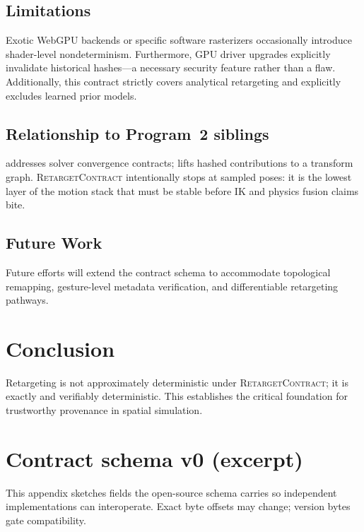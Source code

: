 \documentclass[sigconf,nonacm]{acmart}
\newcommand{\retargetcontract}{\textsc{RetargetContract}}
\begin{document}
\subsection{Limitations}
Exotic WebGPU backends or specific software rasterizers occasionally introduce shader-level nondeterminism. Furthermore, GPU driver upgrades explicitly invalidate historical hashes---a necessary security feature rather than a flaw. Additionally, this contract strictly covers analytical retargeting and explicitly excludes learned prior models. %

\subsection{Relationship to Program~2 siblings}
\cite{paper-7-ik-siggraph2027} addresses solver convergence contracts;
\cite{paper-8-unified-siggraph2027} lifts hashed contributions to a transform
graph. \retargetcontract{} intentionally stops at sampled poses: it is the
lowest layer of the motion stack that must be stable before IK and physics
fusion claims bite.

\subsection{Future Work}
Future efforts will extend the contract schema to accommodate topological remapping, gesture-level metadata verification, and differentiable retargeting pathways. %

\section{Conclusion}
\label{sec:conclusion}

Retargeting is not approximately deterministic under \retargetcontract{}; it is exactly and verifiably deterministic. This establishes the critical foundation for trustworthy provenance in spatial simulation. %

\appendix

\section{Contract schema v0 (excerpt)}
\label{app:schema}

This appendix sketches fields the open-source schema carries so independent
implementations can interoperate. Exact byte offsets may change; version
bytes gate compatibility.
\end{document}
